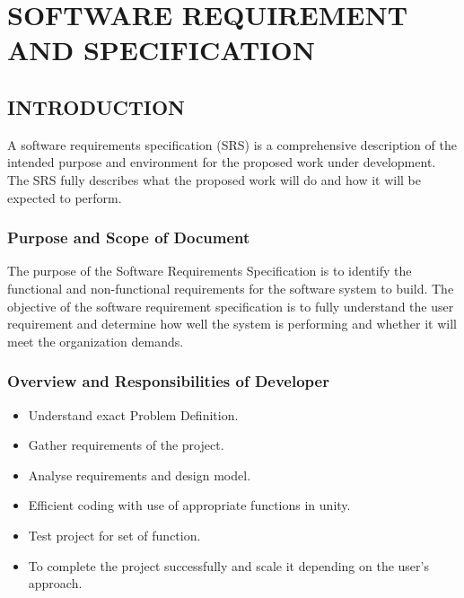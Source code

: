 \documentclass[oneside,a4paper,12pt]{report}
\begin{document}
 
\chapter{SOFTWARE REQUIREMENT AND SPECIFICATION}
\newpage
\section{INTRODUCTION}
\hspace*{0.3in}A software requirements specification (SRS) is a comprehensive description of the intended purpose and environment for the proposed work under development. The SRS fully describes what the proposed work will do and how it will be expected to perform.\\

\subsection{Purpose and Scope of Document}
\hspace*{0.3in}The purpose of the Software Requirements Specification is to identify the functional and non-functional requirements for the software system to build. The objective of the software requirement specification is to fully understand the user requirement and determine how well the system is performing and whether it will meet the organization demands.\\
\subsection{Overview and Responsibilities of Developer}
\begin{itemize}
\item Understand exact Problem Definition.
\item Gather requirements of the project.
\item Analyse requirements and design model.
\item Efficient coding with use of appropriate functions in unity.
\item Test project for set of function.
\item To complete the project successfully and scale it depending on the user\rq s approach.
\end{itemize}
\end{document}
